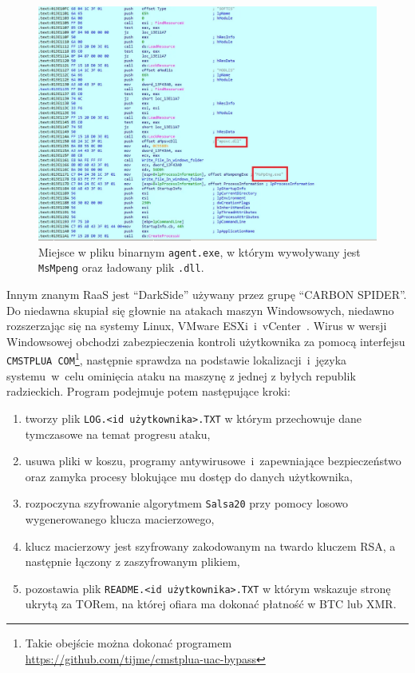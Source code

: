 \begin{figure}[H]
    \centering
    \includegraphics[width=0.8\linewidth]{rysunki/obnjdumpagenta.png}
    \caption{Miejsce w pliku binarnym \texttt{agent.exe}, w którym wywoływany jest \texttt{MsMpeng} oraz ładowany plik \texttt{.dll}\protect \footnotemark. }
    \label{fig:enter-label}
\end{figure}
Innym znanym RaaS jest \foreignquote{english}{DarkSide} używany przez grupę \foreignquote{english}{CARBON SPIDER}. Do niedawna skupiał się głownie na atakach maszyn Windowsowych, niedawno rozszerzając się na systemy Linux, VMware ESXi~i~vCenter~\cite{darkside}. Wirus w wersji Windowsowej obchodzi zabezpieczenia kontroli użytkownika za pomocą interfejsu \texttt{CMSTPLUA COM}\footnote{Takie obejście można dokonać programem \url{https://github.com/tijme/cmstplua-uac-bypass}}, następnie sprawdza na podstawie lokalizacji~i~języka systemu~w~celu ominięcia ataku na maszynę z jednej z byłych republik radzieckich. Program podejmuje potem następujące kroki:
\begin{enumerate}
    \item tworzy plik \texttt{LOG.<id użytkownika>.TXT} w którym przechowuje dane tymczasowe na temat progresu ataku,
    \item usuwa pliki w koszu, programy antywirusowe~i~zapewniające bezpieczeństwo oraz zamyka procesy blokujące mu dostęp do danych użytkownika,
    \item rozpoczyna szyfrowanie algorytmem \texttt{Salsa20} przy pomocy losowo wygenerowanego klucza macierzowego,
    \item klucz macierzowy jest szyfrowany zakodowanym na twardo kluczem RSA, a następnie łączony z zaszyfrowanym plikiem,
    \item pozostawia plik \texttt{README.<id użytkownika>.TXT} w którym wskazuje stronę ukrytą za TORem, na której ofiara ma dokonać płatność w BTC lub XMR.
\end{enumerate}
